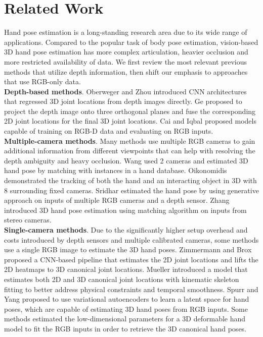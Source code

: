 \documentclass[10pt,twocolumn,letterpaper]{article}
\begin{document}
\section{Related Work}
\indent Hand pose estimation is a long-standing research area due to its wide range of applications. Compared to the popular task of body pose estimation, vision-based 3D hand pose estimation has more complex articulation, heavier occlusion and more restricted availability of data. We first review the most relevant previous methods that utilize depth information, then shift our emphasis to approaches that use RGB-only data.\\
\noindent\textbf{Depth-based methods}. Oberweger \etal \cite{Oberweger} and Zhou \etal \cite{Zhou}  introduced CNN architectures that regressed 3D joint locations from depth images directly. Ge \etal \cite{Ge} proposed to project the depth image onto three orthogonal planes and fuse the corresponding 2D joint locations for the final 3D joint locations. Cai \etal \cite{Cai} and Iqbal \etal \cite{Iqbal} proposed models capable of training on RGB-D data and evaluating on RGB inputs.\\
\noindent\textbf{Multiple-camera methods}. Many methods use multiple RGB cameras to gain additional information from different viewpoints that can help with resolving the depth ambiguity and heavy occlusion. Wang \etal \cite{Wang} used 2 cameras and estimated 3D hand pose by matching with instances in a hand database. Oikonomidis \etal \cite{Oikonomidis} demonstrated the tracking of both the hand and an interacting object in 3D with 8 surrounding fixed cameras. Sridhar \etal \cite{Scridhar,Scridhar2} estimated the hand pose by using generative approach on inputs of multiple RGB cameras and a depth sensor. Zhang \etal \cite{Zhang} introduced 3D hand pose estimation using matching algorithm on inputs from stereo cameras.\\
\noindent\textbf{Single-camera methods}. Due to the significantly higher setup overhead and costs introduced by depth sensors and multiple calibrated cameras, some methods use a single RGB image to estimate the 3D hand poses. Zimmermann and Brox \cite{Zimmermann} proposed a CNN-based pipeline that estimates the 2D joint locations and lifts the 2D heatmaps to 3D canonical joint locations. Mueller \etal \cite{Mueller} introduced a model that estimates both 2D and 3D canonical joint locations with kinematic skeleton fitting to better address physical constraints and temporal smoothness. Spurr \etal \cite{Spurr} and Yang \etal \cite{Yang} proposed to use variational autoencoders to learn a latent space for hand poses, which are capable of estimating 3D hand poses from RGB inputs. Some methods \cite{Baek,Xiang,Ge2} estimated the low-dimensional parameters for a 3D deformable hand model \cite{Romero} to fit the RGB inputs in order to retrieve the 3D canonical hand poses. \\
\end{document}

